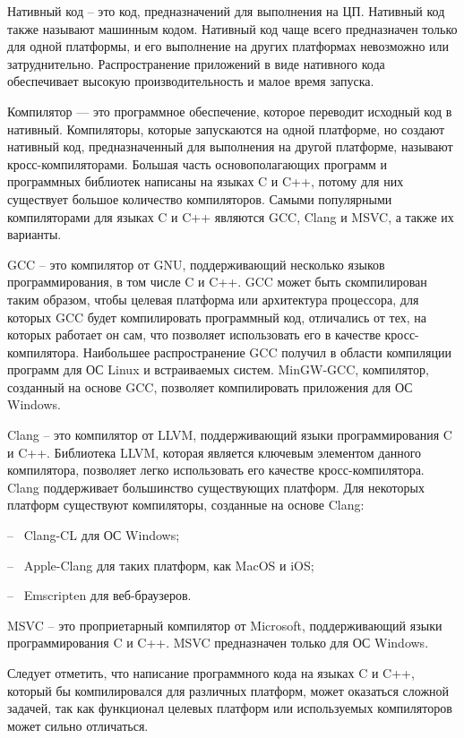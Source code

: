 Нативный код -- это код, предназначений для выполнения на ЦП.
Нативный код также называют машинным кодом.
Нативный код чаще всего предназначен только для одной платформы, и его выполнение на других платформах невозможно или затруднительно.
Распространение приложений в виде нативного кода обеспечивает высокую производительность и малое время запуска.

Компилятор — это программное обеспечение, которое переводит исходный код в нативный.
Компиляторы, которые запускаются на одной платформе, но создают нативный код, предназначенный для выполнения на другой платформе, называют кросс-компиляторами.
Большая часть основополагающих программ и программных библиотек написаны на языках C и C++, потому для них существует большое количество компиляторов.
Самыми популярными компиляторами для языках C и C++ являются GCC, Clang и MSVC, а также их варианты.

GCC -- это компилятор от GNU, поддерживающий несколько языков программирования, в том числе C и C++. 
GCC может быть скомпилирован таким образом, чтобы целевая платформа или архитектура процессора, для которых GCC будет компилировать программный код, отличались от тех, на которых работает он сам, что позволяет использовать его в качестве кросс-компилятора.
Наибольшее распространение GCC получил в области компиляции программ для ОС Linux и встраиваемых систем.
MinGW-GCC, компилятор, созданный на основе GCC, позволяет компилировать приложения для ОС Windows.

Clang -- это компилятор от LLVM, поддерживающий языки программирования C и C++.
Библиотека LLVM, которая является ключевым элементом данного компилятора, позволяет легко использовать его качестве кросс-компилятора. 
Clang поддерживает большинство существующих платформ. 
Для некоторых платформ существуют компиляторы, созданные на основе Clang:

-- ~Clang-CL для ОС Windows;

-- ~Apple-Clang для таких платформ, как MacOS и iOS;

-- ~Emscripten для веб-браузеров.

MSVC -- это проприетарный компилятор от Microsoft, поддерживающий языки программирования C и C++. 
MSVC предназначен только для ОС Windows. 

Следует отметить, что написание программного кода на языках C и C++, который бы компилировался для различных платформ, может оказаться сложной задачей, так как функционал целевых платформ или используемых компиляторов может сильно отличаться.



